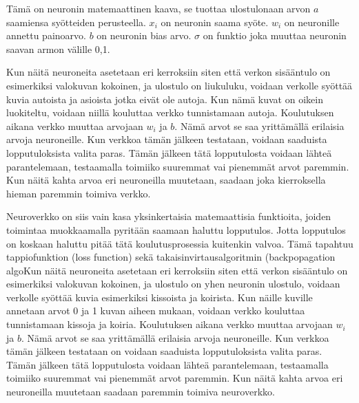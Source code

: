 Tämä on neuronin matemaattinen kaava,
se tuottaa ulostulonaan arvon \(a\) saamiensa syötteiden perusteella.
\(x_i\) on neuronin saama syöte.
\(w_i\) on neuronille annettu painoarvo.
\(b\) on neuronin bias arvo. \(\sigma\) on funktio joka muuttaa neuronin saavan armon välille 0,1.

Kun näitä neuroneita asetetaan eri kerroksiin siten että verkon sisääntulo on esimerkiksi valokuvan kokoinen,
ja ulostulo on liukuluku,
voidaan verkolle syöttää kuvia autoista ja asioista jotka eivät ole autoja.
Kun nämä kuvat on oikein luokiteltu, voidaan niillä kouluttaa verkko tunnistamaan autoja.
Koulutuksen aikana verkko muuttaa arvojaan \(w_i\) ja \(b\).
Nämä arvot se saa yrittämällä erilaisia arvoja neuroneille.
Kun verkkoa tämän jälkeen testataan, voidaan saaduista lopputuloksista valita paras.
Tämän jälkeen tätä lopputulosta voidaan lähteä parantelemaan,
testaamalla toimiiko suuremmat vai pienemmät arvot paremmin.
Kun näitä kahta arvoa eri neuroneilla muutetaan,
saadaan joka kierroksella hieman paremmin toimiva verkko.

Neuroverkko on siis vain kasa yksinkertaisia matemaattisia funktioita,
joiden toimintaa muokkaamalla pyritään saamaan haluttu lopputulos.
Jotta lopputulos on koskaan haluttu pitää tätä koulutusprosessia kuitenkin valvoa.
Tämä tapahtuu tappiofunktion (loss function) sekä takaisinvirtausalgoritmin (backpopagation algoKun näitä neuroneita asetetaan eri kerroksiin siten että verkon sisääntulo on esimerkiksi valokuvan kokoinen, ja ulostulo on yhen neuronin ulostulo, voidaan verkolle syöttää kuvia esimerkiksi kissoista ja koirista. Kun näille kuville annetaan arvot 0 ja 1 kuvan aiheen mukaan, voidaan verkko kouluttaa tunnistamaan kissoja ja koiria. Koulutuksen aikana verkko muuttaa arvojaan \(w_i\) ja \(b\). Nämä arvot se saa yrittämällä erilaisia arvoja neuroneille. Kun verkkoa tämän jälkeen testataan on voidaan saaduista lopputuloksista valita paras. Tämän jälkeen tätä lopputulosta voidaan lähteä parantelemaan, testaamalla toimiiko suuremmat vai pienemmät arvot paremmin. Kun näitä kahta arvoa eri neuroneilla muutetaan saadaan paremmin toimiva neuroverkko.

